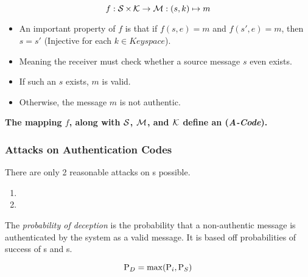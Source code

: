 \begin{equation}\label{eq:Unconditional_Authentication_Code}
  f : \operatorname{\mathcal{S}} \times \operatorname{\mathcal{K}} \rightarrow \mathcal{M} : (s, k) \mapsto m
\end{equation}
\begin{itemize}[noitemsep]
\item An important property of $f$ is that if $f(s, e) = m$ and $f(s', e) = m$, then $s = s'$ (Injective for each $k \in Keyspace$).
\item Meaning the receiver must check whether a source message $s$ even exists.
\item If such an $s$ exists, $m$ is valid.
\item Otherwise, the message $m$ is not authentic.
\end{itemize}

\begin{large}
  \textbf{The mapping $f$, along with $\operatorname{\mathcal{S}}$, $\operatorname{\mathcal{M}}$, and $\operatorname{\mathcal{K}}$ define an  (\emph{A-Code}).}
\end{large}

\subsubsection{Attacks on Authentication Codes}\label{subsubsec:Attacks_Authentication_Codes}
There are only 2 reasonable attacks on s possible.
\begin{enumerate}[noitemsep]
\item {}
\item {}
\end{enumerate}

\begin{definition}\label{def:Probability_of_Deception}
  The \emph{probability of deception} is the probability that a non-authentic message is authenticated by the  system as a valid message.
  It is based off probabilities of success of s and s.
  
  \begin{equation}\label{eq:Probability_of_Deception}
    \operatorname{\operatorname{P}}_{D} = \max(\operatorname{\operatorname{P}}_{i}, \operatorname{\operatorname{P}}_{S})
  \end{equation}
\end{definition}

